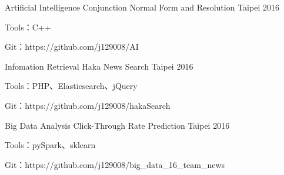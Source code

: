 
\begin{cventries}

  \cventry
    {Artificial Intelligence}
    {Conjunction Normal Form and Resolution}
    {Taipei} %
    {2016} %
    {
      \begin{cvitems} %
        \item {Tools：C++}
        \item {Git：https://github.com/j129008/AI}
      \end{cvitems}
    }


  \cventry
    {Infomation Retrieval}
    {Haka News Search}
    {Taipei} %
    {2016} %
    {
      \begin{cvitems} %
        \item {Tools：PHP、Elasticsearch、jQuery}
        \item {Git：https://github.com/j129008/hakaSearch}
      \end{cvitems}
    }


  \cventry
    {Big Data Analysis}
    {Click-Through Rate Prediction}
    {Taipei} %
    {2016} %
    {
      \begin{cvitems} %
        \item {Tools：pySpark、sklearn}
        \item {Git：https://github.com/j129008/big\_data\_16\_team\_news}
      \end{cvitems}
    }

\end{cventries}
